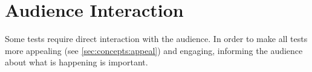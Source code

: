 \section{Audience Interaction}
\label{sec:rules:audience}
Some tests require direct interaction with the audience. In order to make all tests more appealing (see \ref{sec:concepts:appeal}) and engaging, informing the audience about what is happening is important.

